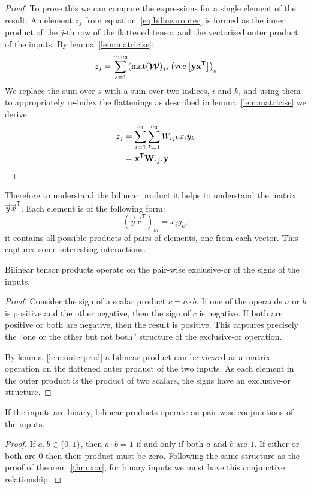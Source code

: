 {\begin{proof}
To
prove this we can compare the expressions for a single element of the result.
An element \(z_j\) from equation~\eqref{eq:bilinearouter}
is formed as the inner product of the \(j\)-th
row of the flattened tensor and the vectorised outer product of the inputs. By 
lemma~\ref{lem:matricise}:
\begin{equation}
	z_j = 
	\sum_{s=1}^{n_1n_3} (\operatorname{mat}(\bm{\mathcal{W}})_{js} 
	\left( \operatorname{vec}\left[\mathbf{y}\mathbf{x}^\mathsf{T}\right]\right)_s
\end{equation}
We replace the sum over \(s\) with a sum over two
indices, \(i\) and \(k\), and using them to appropriately re-index the flattenings 
as described in lemma~\ref{lem:matricise} we 
derive
\begin{align}
	z_j &= \sum_{i=1}^{n_1}\sum_{k=1}^{n_3} W_{ijk} x_i y_k \\
		&= \vec{x}^\mathsf{T}\mat{W}_{\midbullet j \midbullet}\vec{y}
\end{align}

\end{proof}


Therefore to understand the bilinear product it helps to understand the matrix 
\(\vec{y}\vec{x}^\mathsf{T}\). Each element is of the following form:
\[
	(\vec{y}\vec{x}^\mathsf{T})_{ki} = x_iy_k,
\] it contains all possible products of pairs of elements, one from each vector. 
This captures some interesting interactions.

\begin{thm}  \label{thm:xor}
Bilinear tensor products operate on the pair-wise exclusive-or of the
signs of the inputs.
\end{thm}
\begin{proof}
Consider the sign of a scalar product
\(c = a\cdot b\). If one of the operands \(a\) or \(b\) is positive and the other negative,
then the sign of \(c\) is negative. If both are positive or both are negative, then the
result is positive. This captures precisely the ``one or the other but not both'' structure
of the exclusive-or operation.

By lemma~\ref{lem:outerprod} a bilinear product can be viewed as a matrix operation on the flattened
outer product of the two inputs. As each element in the outer product is the product of two scalars,
the signs have an exclusive-or structure.
\end{proof}

\begin{cor}\label{cor:and}
If the inputs are binary, bilinear products operate on pair-wise conjunctions of the inputs.
\end{cor}
\begin{proof}
If \(a, b \in \{0, 1\}\), then \(a \cdot b = 1\) if and only if both \(a\) and \(b\) are \(1\). If
either or both are \(0\) then their product must be zero. Following the same structure as the proof
of theorem~\ref{thm:xor}, for binary inputs we must have this conjunctive relationship.
\end{proof}

}
